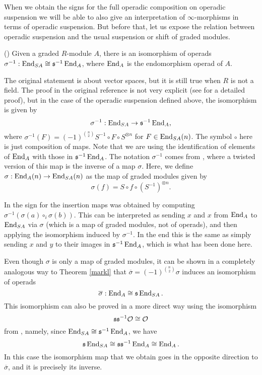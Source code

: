 \documentclass[Thesis.tex]{subfiles}
\begin{document}
When we obtain the signs for the full operadic composition on operadic suspension we will be able to also give an interpretation of $\infty$-morphisms in terms of operadic suspension. But before that, let us expose the relation between operadic suspension and the usual suspension or shift of graded modules.

\begin{thm}\label{markl}(\cite[Chapter 3, Lemma 3.16]{operads})
Given a graded $R$-module $A$, there is an isomorphism of operads $\sigma^{-1}:\operatorname{End}_{S A}\cong \mathfrak{s}^{-1}\operatorname{End}_A$, where $\operatorname{End}_A$ is the endomorphism operad of $A$.
\end{thm}
The original statement is about vector spaces, but it is still true when $R$ is not a field. The proof in the original reference is not very explicit (see   for a detailed proof), but in the case of the operadic suspension defined above, the isomorphism is given by \[\sigma^{-1}:\operatorname{End}_{S A}\to\mathfrak{s}^{-1}\operatorname{End}_A,\] where $\sigma^{-1}(F)=(-1)^{\binom{n}{2}}S^{-1}\circ F\circ S^{\otimes n}$ for $F\in \operatorname{End}_{S A}(n)$. The symbol $\circ$ here is just composition of maps.
Note that we are using the identification of elements of $\operatorname{End}_A$ with those in $\mathfrak{s}^{-1}\operatorname{End}_A$. The notation $\sigma^{-1}$ comes from \cite{RW}, where a twisted version of this map is the inverse of a map $\sigma$. Here, we define $\sigma:\operatorname{End}_A(n)\to\operatorname{End}_{SA}(n)$ as the map of graded modules given by
\begin{equation}\label{sigma}
\sigma(f)= S\circ f \circ (S^{-1})^{\otimes n}.
\end{equation}

In \cite{RW} the sign for the insertion maps was obtained by computing $\sigma^{-1}(\sigma(a)\circ_i\sigma(b))$. This can be interpreted as sending $x$ and $x$ from $\operatorname{End}_A$ to $\operatorname{End}_{S A}$ via $\sigma$ (which is a map of graded modules, not of operads), and then applying the isomorphism induced by $\sigma^{-1}$. In the end this is the same as simply sending $x$ and $y$ to their images in $\mathfrak{s}^{-1}\operatorname{End}_A$, which is what has been done here.

Even though $\sigma$ is only a map of graded modules, it can be shown in a completely analogous way to Theorem \ref{markl} that $\overline{\sigma}=(-1)^{\binom{n}{2}}\sigma$ induces an isomorphism of operads
\begin{equation}\label{barsigma}
\overline{\sigma}:\operatorname{End}_{A}\cong\mathfrak{s}\operatorname{End}_{SA}.
\end{equation}
This isomorphism can also  be proved in a more direct way using the isomorphism \[\mathfrak{s}\mathfrak{s}^{-1}{\mathcal O}\cong{\mathcal O}\] from , namely, since $\operatorname{End}_{SA}\cong \mathfrak{s}^{-1}\operatorname{End}_A$, we have \[\mathfrak{s}\operatorname{End}_{SA}\cong \mathfrak{s}\mathfrak{s}^{-1}\operatorname{End}_A\cong \operatorname{End}_A.\]
In this case the isomorphism map that we obtain goes in the opposite direction to $\overline{\sigma}$, and it is precisely its inverse.
\end{document}
